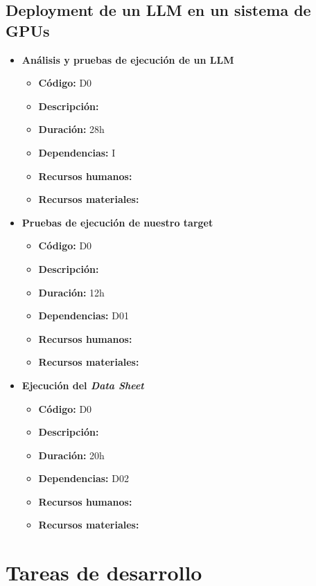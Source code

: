 \subsection{Deployment de un LLM en un sistema de GPUs}
\label{subsec:tareas_gpu}

\begin{itemize}
    \item \textbf{Análisis y pruebas de ejecución de un LLM}
        \begin{itemize}
            \item \textbf{Código:} D0
            \item \textbf{Descripción:}
            \item \textbf{Duración:} 28h
            \item \textbf{Dependencias:} I
            \item \textbf{Recursos humanos:}
            \item \textbf{Recursos materiales:}
        \end{itemize}
    \item \textbf{Pruebas de ejecución de nuestro target}
        \begin{itemize}
            \item \textbf{Código:} D0
            \item \textbf{Descripción:}
            \item \textbf{Duración:} 12h
            \item \textbf{Dependencias:} D01
            \item \textbf{Recursos humanos:}
            \item \textbf{Recursos materiales:}
        \end{itemize}
    \item \textbf{Ejecución del \textit{Data Sheet}}
        \begin{itemize}
            \item \textbf{Código:} D0
            \item \textbf{Descripción:}
            \item \textbf{Duración:} 20h
            \item \textbf{Dependencias:} D02
            \item \textbf{Recursos humanos:}
            \item \textbf{Recursos materiales:}
        \end{itemize}
\end{itemize}

\section{Tareas de desarrollo}
\label{sec:tareas_desarrollo}

